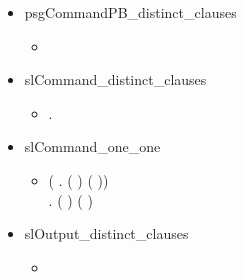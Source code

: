 \begin{itemize}
\begin{itemize}
   \\ \HOLSymConst{\HOLTokenNotEqual{}}  \HOLSymConst{\HOLTokenConj{}}  \HOLSymConst{\HOLTokenNotEqual{}}  \HOLSymConst{\HOLTokenConj{}}
   \\ \HOLSymConst{\HOLTokenNotEqual{}}  \HOLSymConst{\HOLTokenConj{}}  \HOLSymConst{\HOLTokenNotEqual{}} 
 \end{itemize}
 \item psgCommandPB_distinct_clauses
  \begin{itemize}
    \item[] \HOLTokenTurnstile{}  \HOLSymConst{\HOLTokenNotEqual{}} 
    \end{itemize}
    \item slCommand_distinct_clauses
  \begin{itemize}
    \item[] \HOLTokenTurnstile{} \HOLSymConst{\HOLTokenForall{}} .   \HOLSymConst{\HOLTokenNotEqual{}}  
    \end{itemize}
    \item slCommand_one_one
  \begin{itemize}
    \item[] \HOLTokenTurnstile{} (\HOLSymConst{\HOLTokenForall{}} . (  \HOLSymConst{=}  ) \HOLSymConst{\HOLTokenEquiv{}} ( \HOLSymConst{=} )) \HOLSymConst{\HOLTokenConj{}}
   \\\HOLSymConst{\HOLTokenForall{}} . (  \HOLSymConst{=}  ) \HOLSymConst{\HOLTokenEquiv{}} ( \HOLSymConst{=} )
 \end{itemize}
 \item slOutput_distinct_clauses
  \begin{itemize}
    \item[] \HOLTokenTurnstile{}  \HOLSymConst{\HOLTokenNotEqual{}}  \HOLSymConst{\HOLTokenConj{}}  \HOLSymConst{\HOLTokenNotEqual{}}  \HOLSymConst{\HOLTokenConj{}}

\end{itemize}
\end{itemize}
